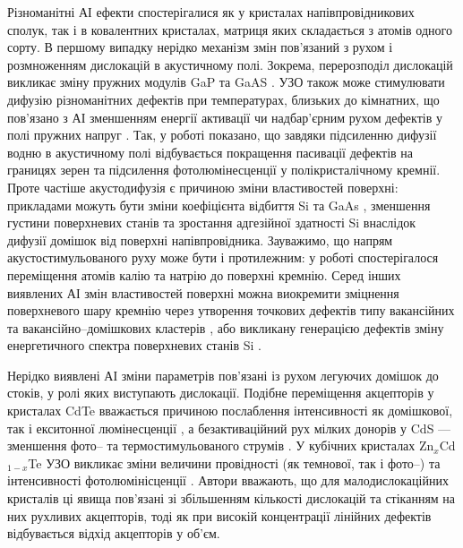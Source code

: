 Різноманітні АІ ефекти спостерігалися як у кристалах напівпровідникових сполук, так і в ковалентних кристалах, матриця яких складається з атомів одного сорту.
В першому випадку нерідко механізм змін пов'язаний з рухом і розмноженням дислокацій в акустичному полі.
Зокрема, перерозподіл дислокацій викликає зміну пружних модулів GaP та GaAS \cite{UST:GaP}.
УЗО також може стимулювати дифузію різноманітних дефектів при температурах, близьких до кімнатних, що пов'язано
з АІ зменшенням  енергії активації чи надбар'єрним рухом дефектів у полі пружних напруг \cite{USdif:FTT90}.
Так, у роботі \cite{Ostapenko1999} показано, що завдяки підсиленню дифузії водню в акустичному полі відбувається покращення пасивації дефектів на границях зерен \cite{Ostapenko1999} та підсилення фотолюмінесценції \cite{Ostap:PhotoLum,ostapenko1997} у полікристалічному кремнії.
Проте частіше акустодифузія є причиною зміни властивостей поверхні:
прикладами можуть бути зміни коефіцієнта відбиття Si та GaAs \cite{Zaver}, зменшення густини  поверхневих станів \cite{Zaver:2008r} та зростання адгезійної здатності \cite{Zaver96} Si внаслідок дифузії домішок від поверхні напівпровідника.
Зауважимо, що напрям акустостимульованого руху може бути і протилежним:
у роботі \cite{Ostrov2002FTPr} спостерігалося переміщення атомів калію та натрію до поверхні кремнію.
Серед інших виявлених АІ змін властивостей поверхні можна виокремити зміцнення поверхневого шару кремнію через утворення точкових дефектів типу вакансійних та вакансійно--домішкових кластерів \cite{Ostrov2000FTPr},
 або викликану генерацією дефектів зміну енергетичного спектра поверхневих станів Si \cite{Zaver:2008r}.

Нерідко виявлені АІ зміни параметрів пов'язані із рухом легуючих домішок до стоків, у ролі яких виступають дислокації.
Подібне переміщення акцепторів у кристалах CdTe вважається причиною послаблення інтенсивності як домішкової, так і екситонної люмінесценції \cite{US:CdTe},
а безактиваційний рух мілких донорів у CdS --- зменшення фото-- та термостимульованого струмів \cite{BorkovFTT,sheinkman1995,BORKOVSKA2003}.
У кубічних кристалах Zn$_x$Cd$_{1-x}$Te  УЗО викликає зміни величини провідності (як темнової, так і фото--) та інтенсивності фотолюмінісценції \cite{US:ZnCdTe}.
Автори вважають, що для малодислокаційних кристалів ці явища пов'язані зі збільшенням кількості дислокацій та стіканням на них рухливих акцепторів, тоді як при високій концентрації лінійних дефектів відбувається відхід акцепторів у об'єм.

